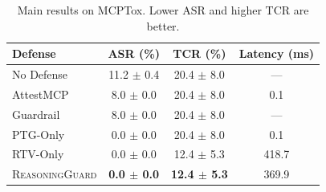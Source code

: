\begin{table}[t]
\centering
\small
\begin{tabular}{lccc}
\toprule
Defense & ASR (\%) & TCR (\%) & Latency (ms) \\
\midrule
No Defense & 11.2 $\pm$ 0.4 & 20.4 $\pm$ 8.0 & --- \\
AttestMCP & 8.0 $\pm$ 0.0 & 20.4 $\pm$ 8.0 & 0.1 \\
Guardrail & 8.0 $\pm$ 0.0 & 20.4 $\pm$ 8.0 & --- \\
PTG-Only & 0.0 $\pm$ 0.0 & 20.4 $\pm$ 8.0 & 0.1 \\
RTV-Only & 0.0 $\pm$ 0.0 & 12.4 $\pm$ 5.3 & 418.7 \\
\textsc{ReasoningGuard} & \textbf{0.0 $\pm$ 0.0} & \textbf{12.4 $\pm$ 5.3} & 369.9 \\
\bottomrule
\end{tabular}
\caption{Main results on MCPTox. Lower ASR and higher TCR are better.}
\label{tab:main}
\end{table}
